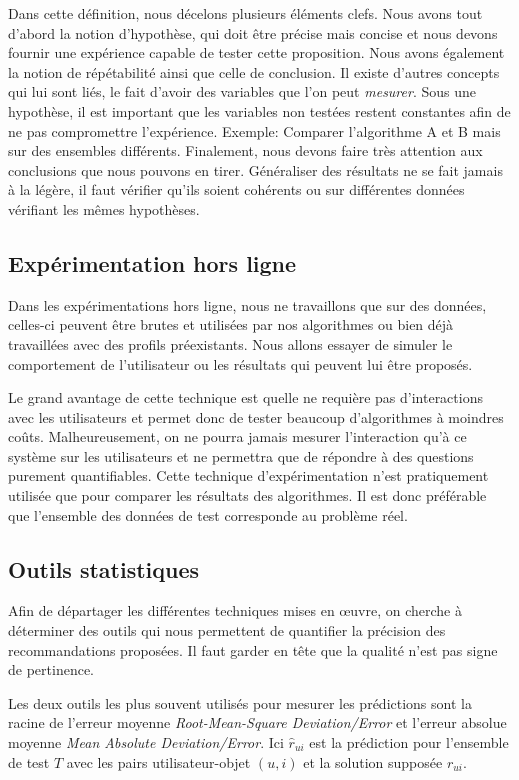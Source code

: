 Dans cette définition, nous décelons plusieurs éléments clefs. Nous avons tout d'abord la notion d'hypothèse, qui doit être précise mais concise  et nous devons fournir une expérience capable de tester cette proposition. Nous avons également la notion de répétabilité ainsi que celle de conclusion. Il existe d'autres concepts qui lui sont liés, le fait d'avoir des variables que l'on peut \textit{mesurer}. Sous une hypothèse, il est important que les variables non testées restent constantes afin de ne pas compromettre l'expérience. Exemple: Comparer l'algorithme A et B mais sur des ensembles différents. Finalement, nous devons faire très attention aux conclusions que nous pouvons en tirer. Généraliser des résultats ne se fait jamais à la légère, il faut vérifier qu'ils soient cohérents ou sur différentes données vérifiant les mêmes hypothèses.

\subsection{Expérimentation hors ligne}

Dans les expérimentations hors ligne, nous ne travaillons que sur des données, celles-ci peuvent être brutes et utilisées par nos algorithmes ou bien déjà travaillées avec des profils préexistants. Nous allons essayer de simuler le comportement de l'utilisateur ou les résultats qui peuvent lui être proposés.

Le grand avantage de cette technique est quelle ne requière pas d'interactions avec les utilisateurs et permet donc de tester beaucoup d'algorithmes à moindres coûts. Malheureusement, on ne pourra jamais mesurer l'interaction qu'à ce système sur les utilisateurs et ne permettra que de répondre à des questions purement quantifiables.
Cette technique d'expérimentation n'est pratiquement utilisée que pour comparer les résultats des algorithmes. Il est donc préférable que l'ensemble des données de test corresponde au problème réel.

\subsection{Outils statistiques}

Afin de départager les différentes techniques mises en œuvre, on cherche à déterminer des outils qui nous permettent de quantifier la précision des recommandations proposées. Il faut garder en tête que la qualité n'est pas signe de pertinence.

Les deux outils les plus souvent utilisés pour mesurer les prédictions sont la racine de l'erreur moyenne \textit{Root-Mean-Square Deviation/Error} et l'erreur absolue moyenne \textit{Mean Absolute Deviation/Error}. Ici $\hat{r}_{ui}$ est la prédiction pour l'ensemble de test $T$ avec les pairs utilisateur-objet $(u, i)$ et la solution supposée $r_{ui}$.

